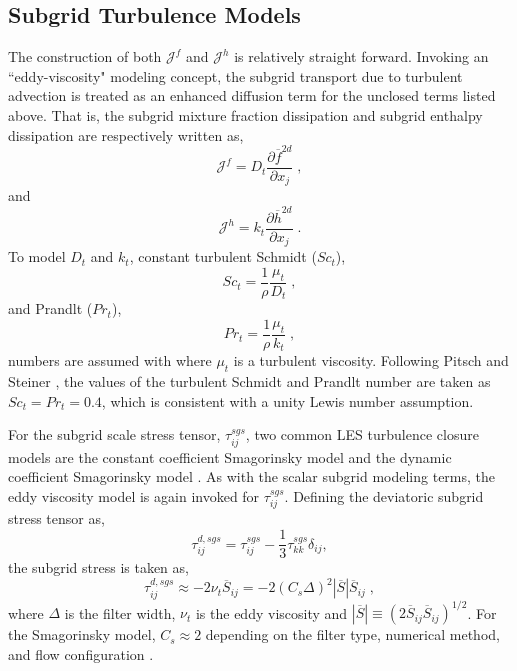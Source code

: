 \subsection{Subgrid Turbulence Models}
%
The construction of both $\mathcal{J}^f$ and $\mathcal{J}^{h}$ is relatively straight forward. Invoking an ``eddy-viscosity" modeling concept, the subgrid transport due to turbulent advection is treated as an enhanced diffusion term for the unclosed terms listed above.   That is, the subgrid mixture fraction dissipation and subgrid enthalpy dissipation are respectively written as, 
%
\begin{equation}
\mathcal{J}^{f} = D_{t} \frac{\partial \overline{f}^{2d}}{\partial x_j} \; , 
\end{equation}
%
and 
%
\begin{equation}
\mathcal{J}^{h} = k_{t} \frac{\partial \overline{h}^{2d}}{\partial x_j} \; .
\end{equation}
%
To model $D_{t}$ and $k_{t}$, constant turbulent Schmidt ($Sc_t$),
%
\begin{equation}\label{eqn:subgrid_mixfrac}
Sc_{t} = \frac{1}{\rho} \frac{\mu_t}{D_t} \; ,
\end{equation}
%
and Prandlt ($Pr_t$), 
%
\begin{equation}\label{eqn:subgrid_enthalpy}
Pr_{t} = \frac{1}{\rho} \frac{\mu_t}{k_t} \; ,
\end{equation}
%
numbers are assumed with where $\mu_t$ is a turbulent viscosity.  Following Pitsch and Steiner \cite{pitsch2000}, the values of the turbulent Schmidt and Prandlt number are taken as $Sc_t = Pr_t = 0.4$, which is consistent with a unity Lewis number assumption.  

For the subgrid scale stress tensor, $\tau^{sgs}_{ij}$, two common LES turbulence closure models are the constant coefficient Smagorinsky model \cite{Smagorinsky178} and the dynamic coefficient Smagorinsky model \cite{Moin158}.  As with the scalar subgrid modeling terms, the eddy viscosity model is again invoked for $\tau^{sgs}_{ij}$.  Defining the deviatoric subgrid stress tensor as, 
%
\begin{equation}
\tau^{d, sgs}_{ij} = \tau^{sgs}_{ij} - \frac{1}{3}\tau^{sgs}_{kk} \delta_{ij}, 
\end{equation}
%
the subgrid stress is taken as,
%
\begin{equation}
\tau_{ij}^{d, sgs} \approx -2 \nu_t \overline{S}_{ij} = -2 (C_s \Delta)^2 |\overline{S}|\overline{S}_{ij} \; , 
\end{equation}
%
where $\Delta$ is the filter width, $\nu_t$ is the eddy viscosity and $|\overline{S}| \equiv (2\overline{S}_{ij}\overline{S}_{ij})^{1/2}$.  For the Smagorinsky model,  $C_s \approx 2$  depending on the filter type, numerical method, and flow configuration \cite{Pope179}.  

